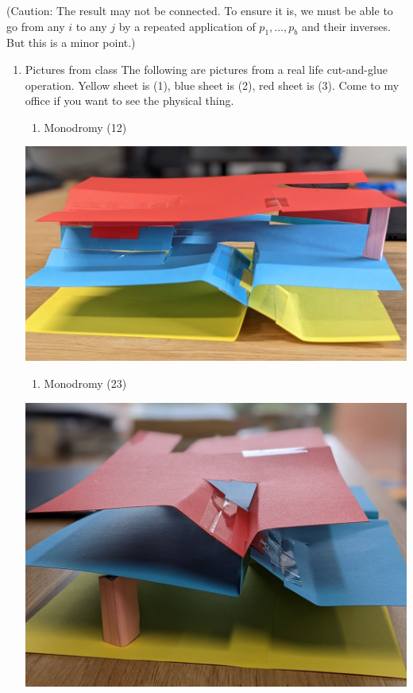 \documentclass[11pt]{article}
\begin{document}
(Caution: The result may not be connected.  To ensure it is, we must be able to go from any \(i\) to any \(j\) by a repeated application of \(p_1, \dots, p_{b}\) and their inverses.  But this is a minor point.)
\begin{enumerate}
\item Pictures from class
\label{sec:org1e1434d}
The following are pictures from a real life cut-and-glue operation.  Yellow sheet is (1), blue sheet is (2), red sheet is (3).  Come to my office if you want to see the physical thing.

\begin{enumerate}
\item Monodromy (12)
\end{enumerate}
\begin{center}
\includegraphics[width=.9\linewidth]{assets/Course_notes/2023-03-28_15-28-25_screenshot.png}
\end{center}

\begin{enumerate}
\item Monodromy (23)
\end{enumerate}

\begin{center}
\includegraphics[width=.9\linewidth]{assets/Course_notes/2023-03-28_15-27-51_screenshot.png}
\end{center}


\end{enumerate}
\end{document}
